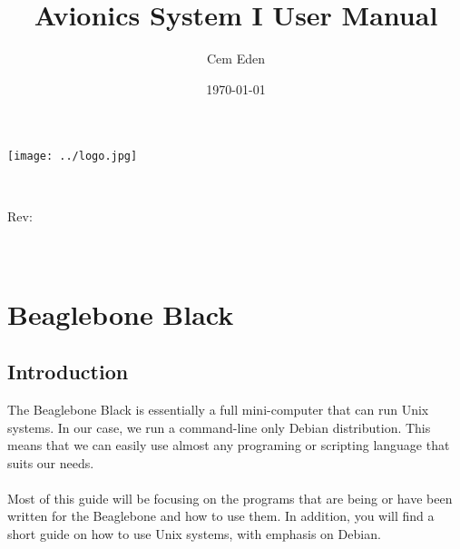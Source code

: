 \documentclass[12pt,article]{memoir}
\title{Avionics System I User Manual}
\author{Cem Eden}
\date{\today}
\makeatletter
\newcommand\@itemcode{}
\newcommand\@revnumber{}
\makeatother
\begin{document}

\makeatletter
\texttt{[image: ../logo.jpg]}\\[4ex]
\begin{center}
	\bfseries \fontsize{50}{50}\selectfont  \@title \\[2ex]
	\LARGE  \@itemcode
\end{center}
\vfill
\begin{flushright}
	\LARGE Rev: \@revnumber\\
	\large \@author\\
	\large \@date\\[18ex]
\end{flushright}
\makeatother
\thispagestyle{empty}
\newpage

\tableofcontents*
\thispagestyle{fancy}
\newpage


\chapter{Beaglebone Black}
\section{Introduction}
The Beaglebone Black is essentially a full mini-computer that can run Unix systems. In our case, we run a command-line only Debian distribution. This means that we can easily use almost any programing or scripting language that suits our needs.\\\\

\noindent
Most of this guide will be focusing on the programs that are being or have been written for the Beaglebone and how to use them. In addition, you will find a short guide on how to use Unix systems, with emphasis on Debian.\\
\end{document}
